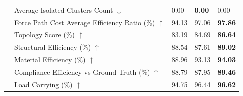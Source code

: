 \begin{table}[!h]
{\begin{tabular}{lllll}
 & Average Isolated Clusters Count $\downarrow$ & 0.00 & \textbf{0.00} & 0.00 \\
 & Force Path Cost Average Efficiency Ratio (\%) $\uparrow$ & 94.13 & 97.06 & \textbf{97.86} \\
 & Topology Score (\%) $\uparrow$ & 83.19 & 84.69 & \textbf{86.64} \\
 & Structural Efficiency (\%) $\uparrow$ & 88.54 & 87.61 & \textbf{89.02} \\
 & Material Efficiency (\%) $\uparrow$ & 88.96 & 93.13 & \textbf{94.03} \\
 & Compliance Efficiency vs Ground Truth (\%) $\uparrow$ & 88.79 & 87.95 & \textbf{89.46} \\
 & Load Carrying (\%) $\uparrow$ & 94.75 & 96.44 & \textbf{96.62} \\
    \bottomrule
  \end{tabular}
  }
\end{table}